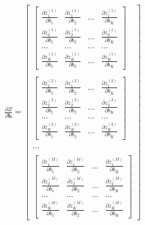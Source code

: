 \documentclass[UTF8]{article}
\begin{document}
\begin{equation}
\begin{aligned}
\frac{\partial{Z}}{\partial{\boldsymbol{b}}}=\begin{bmatrix}
\begin{bmatrix}
 \frac{\partial{z}_{1}^{(1)}}{\partial{b}_{1}} & \frac{\partial{z}_{1}^{(1)}}{\partial{b}_{2}} & ... & \frac{\partial{z}_{1}^{(1)}}{\partial{b}_{K}} \\
 \frac{\partial{z}_{2}^{(1)}}{\partial{b}_{1}} & \frac{\partial{z}_{2}^{(1)}}{\partial{b}_{2}} & ... & \frac{\partial{z}_{2}^{(1)}}{\partial{b}_{K}} \\
 ... & ... & ... & ... \\
 \frac{\partial{z}_{K}^{(1)}}{\partial{b}_{1}} & \frac{\partial{z}_{K}^{(1)}}{\partial{b}_{2}} & ... & \frac{\partial{z}_{K}^{(1)}}{\partial{b}_{K}}
 \end{bmatrix} \\ \\
\begin{bmatrix}
 \frac{\partial{z}_{1}^{(2)}}{\partial{b}_{1}} & \frac{\partial{z}_{1}^{(2)}}{\partial{b}_{2}} & ... & \frac{\partial{z}_{1}^{(2)}}{\partial{b}_{K}} \\
 \frac{\partial{z}_{2}^{(2)}}{\partial{b}_{1}} & \frac{\partial{z}_{2}^{(2)}}{\partial{b}_{2}} & ... & \frac{\partial{z}_{2}^{(2)}}{\partial{b}_{K}} \\
 ... & ... & ... & ... \\
 \frac{\partial{z}_{K}^{(2)}}{\partial{b}_{1}} & \frac{\partial{z}_{K}^{(2)}}{\partial{b}_{2}} & ... & \frac{\partial{z}_{K}^{(2)}}{\partial{b}_{K}}
 \end{bmatrix} \\ \\
 ... \\ \\
 \begin{bmatrix}
 \frac{\partial{z}_{1}^{(M)}}{\partial{b}_{1}} & \frac{\partial{z}_{1}^{(M)}}{\partial{b}_{2}} & ... & \frac{\partial{z}_{1}^{(M)}}{\partial{b}_{K}} \\
 \frac{\partial{z}_{2}^{(M)}}{\partial{b}_{1}} & \frac{\partial{z}_{2}^{(M)}}{\partial{b}_{2}} & ... & \frac{\partial{z}_{2}^{(M)}}{\partial{b}_{K}} \\
 ... & ... & ... & ... \\
 \frac{\partial{z}_{K}^{(M)}}{\partial{b}_{1}} & \frac{\partial{z}_{K}^{(M)}}{\partial{b}_{2}} & ... & \frac{\partial{z}_{K}^{(M)}}{\partial{b}_{K}}
 \end{bmatrix}

\end{bmatrix}
\end{aligned}
\end{equation}
\end{document}
